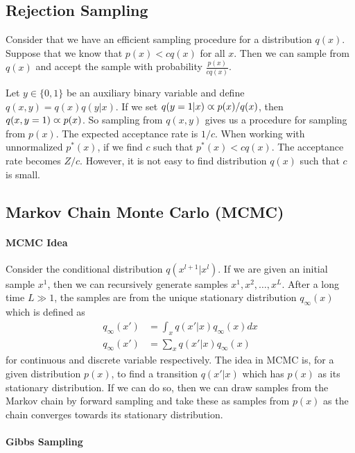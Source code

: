 \subsection{Rejection Sampling}

Consider that we have an efficient sampling procedure for a distribution $q(x)$. Suppose that we know that $p(x)<cq(x)$ for all $x$. Then we can sample from $q(x)$ and accept the sample with probability $\frac{p(x)}{cq(x)}$.

Let $y\in\{0,1\}$ be an auxiliary binary variable and define $q(x,y)=q(x)q(y|x)$. If we set $q(y=1|x)\varpropto p(x)/q(x)$, then $q(x,y=1)\varpropto p(x)$. So sampling from $q(x,y)$ gives us a procedure for sampling from $p(x)$. The expected acceptance rate is $1/c$. When working with unnormalized $p^*(x)$, if we find $c$ such that $p^*(x)<cq(x)$. The acceptance rate becomes $Z/c$. However, it is not easy to find distribution $q(x)$ such that $c$ is small.

\subsection{Markov Chain Monte Carlo (MCMC)}

\paragraph{MCMC Idea}

Consider the conditional distribution $q(x^{l+1}|x^l)$. If we are given an initial sample $x^1$, then we can recursively generate samples $x^1,x^2,\dotsc,x^L$. After a long time $L\gg 1$, the samples are from the unique stationary distribution $q_\infty(x)$ which is defined as
\begin{align*}
q_\infty(x')&=\int_xq(x'|x)q_\infty(x)dx \\
q_\infty(x')&=\sum_xq(x'|x)q_\infty(x)
\end{align*}
for continuous and discrete variable respectively. The idea in MCMC is, for a given distribution $p(x)$, to find a transition $q(x'|x)$ which has $p(x)$ as its stationary distribution. If we can do so, then we can draw samples from the Markov chain by forward sampling and take these as samples from $p(x)$ as the chain converges towards its stationary distribution.

\paragraph{Gibbs Sampling}

